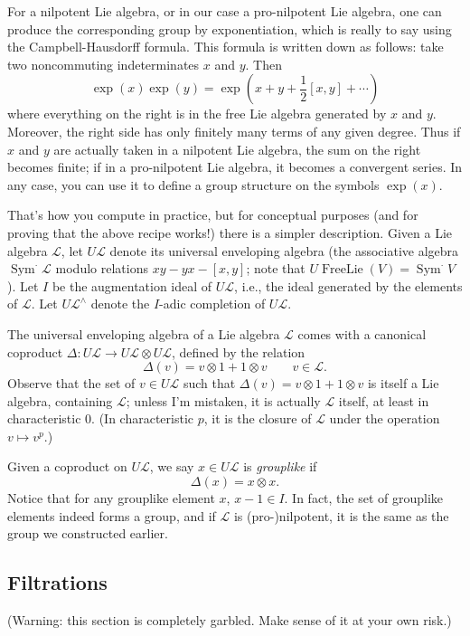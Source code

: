\documentclass[12pt]{article}
\def\calL{\mathcal{L}}
\DeclareMathOperator{\FreeLie}{FreeLie}
\DeclareMathOperator{\Sym}{Sym}
\begin{document}
For a nilpotent Lie algebra, or in our case a pro-nilpotent Lie algebra,
one can produce the corresponding group by exponentiation, which is really
to say using the Campbell-Hausdorff formula. This formula is written down as
follows: take two noncommuting indeterminates $x$ and $y$. Then
\[
\exp(x) \exp(y) = \exp\left(x + y + \frac{1}{2}[x,y] + \cdots \right)
\]
where everything on the right is in the free Lie algebra generated by $x$ 
and $y$. Moreover, the right side has only finitely many terms of any
given degree. Thus if $x$ and $y$ are actually taken in a nilpotent Lie
algebra, the sum on the right becomes finite; if in a pro-nilpotent Lie
algebra, it becomes a convergent series. In any case, you can use it
to define a group structure on the symbols $\exp(x)$.

That's how you compute in practice, but for conceptual purposes (and for
proving that the above recipe works!) there is a simpler description.
Given a Lie algebra $\calL$, let $U\calL$ denote its universal enveloping
algebra (the associative algebra $\Sym^{\cdot} \calL$ modulo relations
$xy -yx - [x,y]$; note that $U\FreeLie(V) = \Sym^{\cdot} V$). Let $I$
be the augmentation ideal of $U\calL$, i.e., the ideal generated by
the elements of $\calL$. Let $U\calL^\wedge$ denote the $I$-adic completion
of $U\calL$.

The universal enveloping algebra of a Lie algebra $\calL$ comes with a
canonical coproduct $\Delta: U\calL \to U\calL \otimes U\calL$, defined
by the relation
\[
\Delta(v) = v \otimes 1 + 1 \otimes v \qquad v \in \calL.
\]
Observe that the set of $v \in U\calL$ such that
$\Delta(v) = v \otimes 1 + 1 \otimes v$ is itself a Lie algebra,
containing $\calL$; unless I'm mistaken, it is actually $\calL$ itself,
at least in characteristic 0. (In characteristic $p$, it is the closure
of $\calL$ under the operation $v \mapsto v^p$.)

Given a coproduct on $U\calL$, we say $x \in U\calL$ is \emph{grouplike}
if 
\[
\Delta(x) = x \otimes x.
\]
Notice that for any grouplike element $x$, $x-1 \in I$.
In fact, the set of grouplike elements indeed forms a group, and
if $\calL$ is (pro-)nilpotent, it is the same as the group we constructed
earlier.

\subsection*{Filtrations}

(Warning: this section is completely garbled. Make sense of it at your
own risk.)
\end{document}
